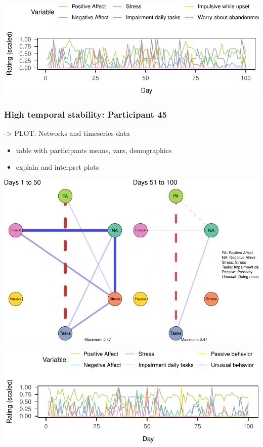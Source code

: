 \documentclass[
  english,
  man]{apa6}
\providecommand{\tightlist}{%
  \setlength{\itemsep}{0pt}\setlength{\parskip}{0pt}}
\begin{document}
\includegraphics{ThesisAnalysisV2_files/figure-latex/plotPx53Descr-1.pdf}

\hypertarget{high-temporal-stability-participant-45}{%
\subsubsection{High temporal stability: Participant 45}\label{high-temporal-stability-participant-45}}

-\textgreater{} PLOT: Networks and timeseries data

\begin{itemize}
\tightlist
\item
  table with participants means, vars, demographics
\item
  explain and interpret plots
\end{itemize}

\includegraphics{ThesisAnalysisV2_files/figure-latex/plotPx45Netws-1.pdf}

\includegraphics{ThesisAnalysisV2_files/figure-latex/plotPx45Descr-1.pdf}
\end{document}

